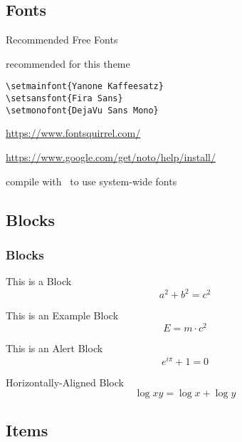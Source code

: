 \documentclass[compress,aspectratio=169, table]{beamer}
\begin{document}
\subsection{Fonts}

\begin{frame}[fragile]{Recommended Free Fonts}
  \begin{description}
  \item[Selected Fonts] recommended for this theme\\
    \begin{lstlisting}[basicstyle = \ttfamily\small]
\setmainfont{Yanone Kaffeesatz}
\setsansfont{Fira Sans}
\setmonofont{DejaVu Sans Mono}
    \end{lstlisting}
  \item[Download] {\small \url{https://www.fontsquirrel.com/}}
  \item[Install Fonts] {\small \url{https://www.google.com/get/noto/help/install/}}
  \item[Compilation] compile with \XeLaTeX~to use system-wide fonts
  \end{description}

\end{frame}


\subsection{Blocks}

\begin{frame}
  \frametitle{Blocks}
  \begin{block}{This is a Block}
    \[
      a^2 + b^2 = c^2
    \]
  \end{block}
  \begin{exampleblock}{This is an Example Block}
    \[
      E = m \cdot c^{2}
    \]
  \end{exampleblock}
  \begin{alertblock}{This is an Alert Block}
    \[
      e^{i\pi} + 1 = 0
    \]
  \end{alertblock}

  \centering
  \begin{minipage}{1.0\linewidth}
    \begin{block}{Horizontally-Aligned Block}
      \[
        \log xy = \log x + \log y
      \]
    \end{block}
  \end{minipage}
\end{frame}

\subsection{Items}
\end{document}

